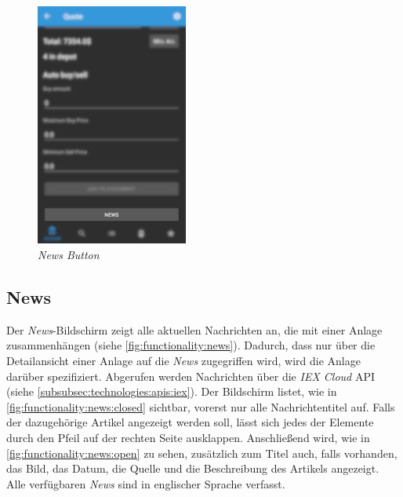\documentclass[a4paper]{article}
\begin{document}
\begin{figure}[H]
    \centering
    \includegraphics[height=8cm,keepaspectratio]{./images/news/news_button.png}
    \caption{\textit{News Button}}
    \label{fig:functionality:news:button}
\end{figure}


\subsection{News}
\label{subsec:functionality:news}
Der \textit{News}-Bildschirm zeigt alle aktuellen Nachrichten an, die mit einer Anlage zusammenhängen (siehe \autoref{fig:functionality:news}).
Dadurch, dass nur über die Detailansicht einer Anlage auf die \textit{News} zugegriffen wird, wird die Anlage darüber spezifiziert.
Abgerufen werden Nachrichten über die \textit{IEX Cloud} API (siehe \autoref{subsubsec:technologies:apis:iex}).
Der Bildschirm listet, wie in \autoref{fig:functionality:news:closed} sichtbar, vorerst nur alle Nachrichtentitel auf.
Falls der dazugehörige Artikel angezeigt werden soll, lässt sich jedes der Elemente durch den Pfeil auf der rechten Seite ausklappen.
Anschließend wird, wie in \autoref{fig:functionality:news:open} zu sehen, zusätzlich zum Titel auch, falls vorhanden, das Bild, das Datum, die Quelle und die Beschreibung des Artikels angezeigt.
Alle verfügbaren \textit{News} sind in englischer Sprache verfasst.
\end{document}
